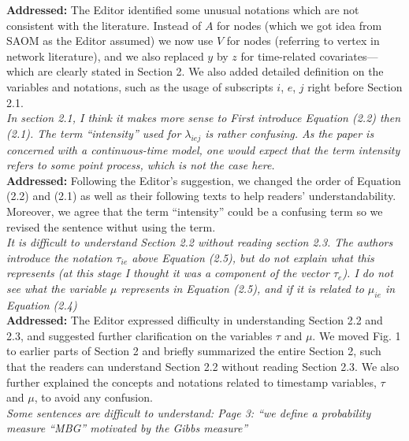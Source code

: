 \documentclass[12pt]{article}
\newcommand{\grey}[1]{{\color{mygrey}#1}}
\theoremstyle{definition}
\begin{document}
\noindent \textcolor{MyGreen}{\textbf{Addressed:}} The Editor identified some unusual notations which are not consistent with the literature. Instead of $A$ for nodes (which we got idea from SAOM as the Editor assumed) we now use $V$ for nodes (referring to vertex in network literature), and we also replaced $y$ by $z$ for time-related covariates---which are clearly stated in Section 2. We also added detailed definition on the variables and notations, such as the usage of subscripts $i$, $e$, $j$ right before Section 2.1. \\

 \grey{\emph{In section 2.1, I think it makes more sense to First introduce Equation (2.2) then (2.1). The term ``intensity'' used for $\lambda_{iej}$ is rather confusing. As the paper is concerned with a continuous-time model, one would expect that the term intensity refers to some point process, which is not the case here. }}\\

\noindent \textcolor{MyGreen}{\textbf{Addressed:}} Following the Editor's suggestion, we changed the order of Equation (2.2) and (2.1) as well as their following texts to help readers' understandability. Moreover, we agree that the term ``intensity'' could be a confusing term so we revised the sentence withut using the term.\\


 \grey{\emph{It is difficult to understand Section 2.2 without reading section 2.3. The authors introduce the notation $\tau_{ie}$ above Equation (2.5), but do not explain what this represents (at this stage I thought it was a component of the vector $\tau_e$). I do not see what the variable $\mu$ represents in Equation (2.5), and if it is related to $\mu_{ie}$ in Equation (2.4)
 }}\\

\noindent \textcolor{MyGreen}{\textbf{Addressed:}} The Editor expressed difficulty in understanding Section 2.2 and 2.3, and suggested further clarification on the variables $\tau$ and $\mu$. We moved Fig. 1 to earlier parts of Section 2 and briefly summarized the entire Section 2, such that the readers can understand Section 2.2 without reading Section 2.3. We also further explained the concepts and notations related to timestamp variables, $\tau$ and $\mu$, to avoid any confusion.\\



 \grey{\emph{ Some sentences are difficult to understand:
Page 3: ``we define a probability measure ``MBG'' motivated by the Gibbs measure'' }}\\
\end{document}
